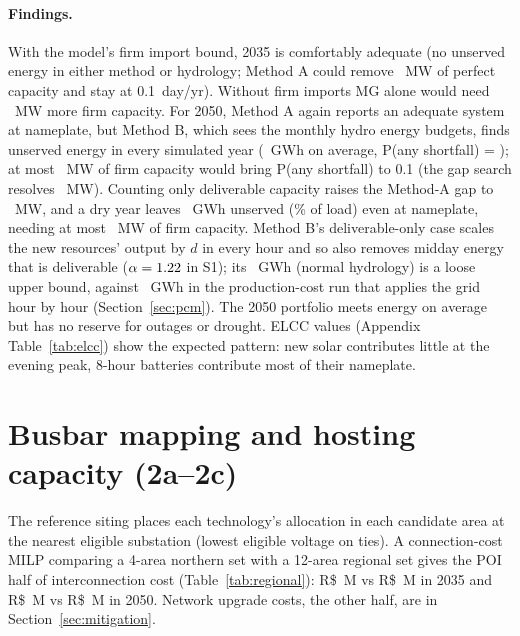 \documentclass[10pt]{article}
\newcommand{\RS}{R\$}
\begin{document}
\paragraph{Findings.} With the model's firm import bound, 2035 is comfortably adequate (no unserved energy in either method or
hydrology; Method A could remove \NpcsurplusA~MW of perfect capacity and stay at 0.1~day/yr). Without firm imports MG alone would need
\NpcgapAnameplatenofirmimports~MW more firm capacity. For 2050, Method A again reports an adequate system at nameplate, but Method B, which
sees the monthly hydro energy budgets, finds unserved energy in every simulated year (\NeueBnormalname~GWh on average,
P(any shortfall) = \NpanyBnormalname); at most \NgapBnormalname~MW of firm capacity would bring P(any shortfall) to 0.1 (the gap search resolves \Ngapres~MW). Counting only deliverable
capacity raises the Method-A gap to \NpcgapBdeliverableonly~MW, and a dry year leaves \NeueBdryname~GWh unserved (\NeuepctBdryname\% of
load) even at nameplate, needing at most \NgapBdryname~MW of firm capacity. Method B's deliverable-only case scales the new resources' output by
$d$ in every hour and so also removes midday energy that is deliverable ($\alpha=1.22$ in S1); its \NeueBnormaldel~GWh
(normal hydrology) is a loose upper bound, against \Nensbexistinggrid~GWh in the production-cost run that applies the grid hour by hour
(Section~\ref{sec:pcm}). The 2050 portfolio meets energy on average but has no reserve for
outages or drought. ELCC values (Appendix Table~\ref{tab:elcc}) show the expected pattern: new solar contributes little at the evening peak,
8-hour batteries contribute most of their nameplate.

\section{Busbar mapping and hosting capacity (2a--2c)}
The reference siting places each technology's allocation in each candidate area at the nearest eligible substation (lowest eligible
voltage on ties). A connection-cost MILP comparing a 4-area northern set with a 12-area regional set gives the POI half of
interconnection cost (Table~\ref{tab:regional}): \RS\NpoicostAL~M vs \RS\NpoicostAR~M in 2035 and \RS\NpoicostBL~M vs \RS\NpoicostBR~M in
2050. Network upgrade costs, the other half, are in Section~\ref{sec:mitigation}.
\end{document}
